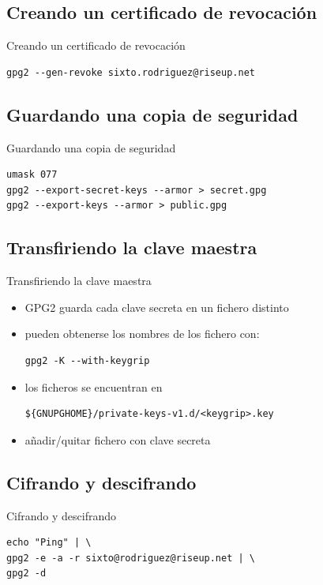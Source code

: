 \documentclass{beamer}
\begin{document}
\subsection{Creando un certificado de revocación}
\begin{frame}[fragile]{Creando un certificado de revocación}
\begin{lstlisting}
gpg2 --gen-revoke sixto.rodriguez@riseup.net
\end{lstlisting}
\end{frame}


\subsection{Guardando una copia de seguridad}
\begin{frame}[fragile]{Guardando una copia de seguridad}
\begin{lstlisting}
umask 077
gpg2 --export-secret-keys --armor > secret.gpg
gpg2 --export-keys --armor > public.gpg
\end{lstlisting}
\end{frame}


\subsection{Transfiriendo la clave maestra}
\begin{frame}[fragile]{Transfiriendo la clave maestra}
\begin{itemize}
    \item GPG2 guarda cada clave secreta en un fichero distinto
    \item pueden obtenerse los nombres de los fichero con:
        \begin{lstlisting}
gpg2 -K --with-keygrip
        \end{lstlisting}
    \item los ficheros se encuentran en
        \begin{lstlisting}
${GNUPGHOME}/private-keys-v1.d/<keygrip>.key
        \end{lstlisting}
    \item añadir/quitar fichero con clave secreta
\end{itemize}
\end{frame}


\subsection{Cifrando y descifrando}
\begin{frame}[fragile]{Cifrando y descifrando}
\begin{lstlisting}
echo "Ping" | \
gpg2 -e -a -r sixto@rodriguez@riseup.net | \
gpg2 -d
\end{lstlisting}
\end{frame}
\end{document}
